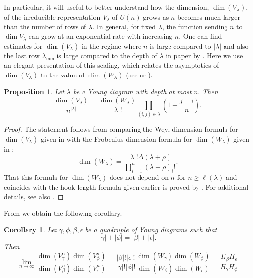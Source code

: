 \documentclass[notitlepage, 11pt, letterpaper]{amsart}
\theoremstyle{plain}
\newtheorem{cor}[thm]{Corollary}
\newtheorem{prop}[thm]{Proposition}
\theoremstyle{definition}
\let\cref\crtcref
\newcommand{\yb}{\beta}
\newcommand{\yc}{\gamma}
\newcommand{\ye}{\epsilon}
\newcommand{\yf}{\phi}
\newcommand{\yx}{\lambda}
\newcommand{\syb}{|\yb|}
\newcommand{\syc}{|\yc|}
\newcommand{\sye}{|\ye|}
\newcommand{\syf}{|\yf|}
\newcommand{\syx}{|\yx|}
\begin{document}
In particular, it will useful to better understand how the dimension, $\dim(V_{\yx})$, of the irreducible representation $V_{\yx}$ of $U(n)$ grows as $n$ becomes much larger than the number of rows of $\yx$.
In general, for fixed $\yx$, the function sending $n$ to $\dim V_{\yx}$ can grow at an exponential rate with increasing $n$.
One can find estimates for $\dim(V_{\yx})$ in the regime where $n$ is large compared to ${\syx}$ and also the last row $\yx_{\min}$ is large compared to the depth of $\yx$ in paper by  \cite[Section III]{itzykson1966unitary}.
Here we use an elegant presentation of this scaling, which relates the asymptotics of $\dim(V_{\yx})$ to the value of $\dim(W_{\yx})$ (see \cite[Lemma 2]{harrow2023approximate} or \cite[Equations (25,26)]{childs2007weak}).
\begin{prop}
    \label{prop:harrow_formula}
    Let $\yx$ be a Young diagram with depth at most $n$. Then
    \begin{equation}
        \frac{\dim(V_{\yx})}{n^{{\syx}}} = \frac{\dim(W_{\yx})}{{\syx}!}\prod_{(i,j) \in \yx} \left(1 + \frac{j-i}{n}\right).
    \end{equation}
\end{prop}
\begin{proof}
    The statement follows from comparing the Weyl dimension formula for $\dim(V_{\yx})$ given in \cref{eq:frob_dim} with the Frobenius dimension formula for $\dim(W_{\yx})$ given in \cite[Corollaries 9.1.5]{goodman2000representations}:
    \begin{equation}
        \label{eq:frob_dim}
        \dim(W_{\yx}) = \frac{{\syx}!\Delta(\yx + \rho)}{\prod_{i=1}^{n}(\yx+\rho)_i!}.
    \end{equation}
    That this formula for $\dim(W_{\yx})$ does not depend on $n$ for $n \geq \ell(\yx)$ and coincides with the hook length formula given earlier is proved by \cite[Corollary 9.1.6]{goodman2000representations}.
    For additional details, see also \cite[Appendix A]{harrow2023approximate}.
\end{proof}
From \cref{prop:harrow_formula} we obtain the following corollary.
\begin{cor}
    \label{cor:harrow_ssa_lim}
    Let $\yc,\yf,\yb,\ye$ be a quadruple of Young diagrams such that
    \begin{equation}
        \label{eq:balanced_sizes}
        {\syc}+{\syf} = {\syb}+{\sye}.
    \end{equation}
    Then
    \begin{equation}
        \lim_{n\to\infty}
        \frac{\dim(V_{\yc}^n) \dim(V_{\yf}^n)}{\dim(V_{\yb}^n) \dim(V_{\ye}^n)} =
        \frac{{\syb}!{\sye}!}{{\syc}!{\syf}!}
        \frac{\dim(W_{\yc}) \dim(W_{\yf})}{\dim(W_{\yb}) \dim(W_{\ye})}
        = \frac{H_{\yb}H_{\ye}}{H_{\yc}H_{\yf}}
    \end{equation}
\end{cor}
\end{document}
